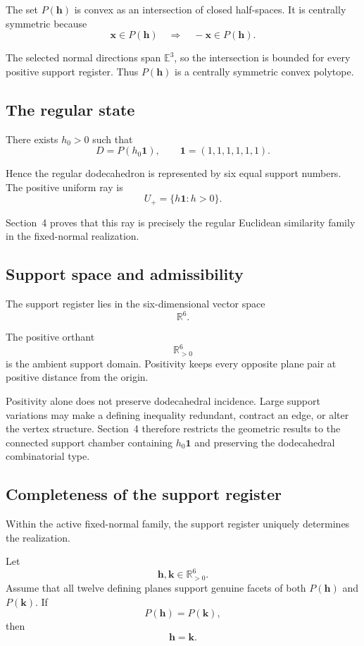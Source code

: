 The set \(P(\mathbf h)\) is convex as an intersection of closed
half-spaces. It is centrally symmetric because
\[
\mathbf x\in P(\mathbf h)
\quad\Longrightarrow\quad
-\mathbf x\in P(\mathbf h).
\]

The selected normal directions span \(\mathbb E^3\), so the intersection is
bounded for every positive support register. Thus \(P(\mathbf h)\) is a
centrally symmetric convex polytope.

\subsection{The regular state}

There exists \(h_0>0\) such that
\[
D=P(h_0\mathbf 1),
\qquad
\mathbf 1=(1,1,1,1,1,1).
\]

Hence the regular dodecahedron is represented by six equal support numbers.
The positive uniform ray is
\[
U_+
=
\{h\mathbf 1:h>0\}.
\]

Section~4 proves that this ray is precisely the regular Euclidean similarity
family in the fixed-normal realization.

\subsection{Support space and admissibility}

The support register lies in the six-dimensional vector space
\[
\mathbb R^6.
\]

The positive orthant
\[
\mathbb R_{>0}^6
\]
is the ambient support domain. Positivity keeps every opposite plane pair
at positive distance from the origin.

Positivity alone does not preserve dodecahedral incidence. Large support
variations may make a defining inequality redundant, contract an edge, or
alter the vertex structure. Section~4 therefore restricts the geometric
results to the connected support chamber containing \(h_0\mathbf 1\) and
preserving the dodecahedral combinatorial type.

\subsection{Completeness of the support register}

Within the active fixed-normal family, the support register uniquely
determines the realization.

\begin{proposition}
Let
\[
\mathbf h,\mathbf k\in\mathbb R_{>0}^6.
\]
Assume that all twelve defining planes support genuine facets of both
\(P(\mathbf h)\) and \(P(\mathbf k)\). If
\[
P(\mathbf h)=P(\mathbf k),
\]
then
\[
\mathbf h=\mathbf k.
\]
\end{proposition}

